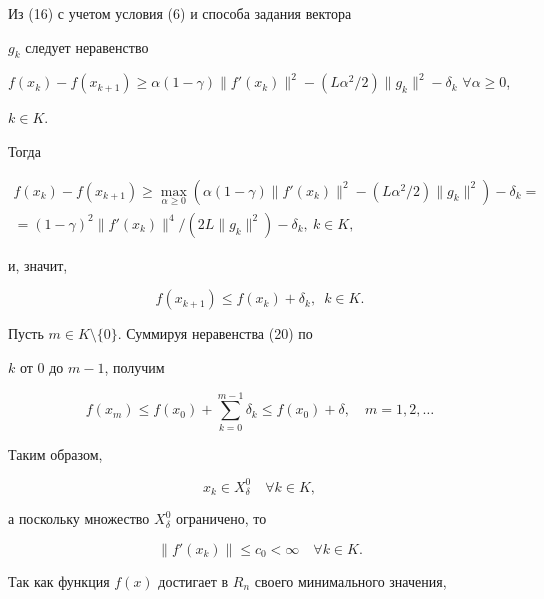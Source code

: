 \begin{pf} Из (16) с учетом условия (6) и способа задания вектора


$g_k$ следует неравенство


$f(x_k)-f(x_{k+1})\ge\alpha(1-\gamma)\|f'(x_k)\|^2-


(L\alpha^2/2)\|g_k\|^2-\delta_k$ $\forall \alpha \geq 0$,


$k\in K$.


Тогда


\begin{multline}


f(x_k)-f(x_{k+1})\ge \max_{\alpha\ge 0}(\alpha(1-\gamma)\|f'(x_k)\|^2-


(L\alpha^2/2)\|g_k\|^2)-\delta_k= \\


=(1-\gamma)^2\|f'(x_k)\|^4/(2L\|g_k\|^2)-\delta_k,\ k\in K,


\end{multline}


и, значит,


\begin{equation}


f(x_{k+1})\leq f(x_k)+\delta_k,\ \; k\in K.


\end{equation}


Пусть $m\in K\setminus \{ 0\}$. Суммируя неравенства (20) по


$k$ от 0 до $m-1$, получим


$$


f(x_m)\leq f(x_0)+\sum_{k=0}^{m-1} \delta_k\leq f(x_0)+\delta,\quad 


m=1,2,\dotsc


$$


Таким образом,


\begin{equation}


x_k\in X^0_{\delta}\quad \forall k\in K,


\end{equation}


а поскольку множество $X^{0}_{\delta }$ ограничено, то


\begin{equation}


\|f'(x_k)\| \leq c_0<\infty \quad \forall k\in K.


\end{equation}


Так как функция $f(x)$ достигает в $R_n$ своего минимального значения,



\end{pf}
